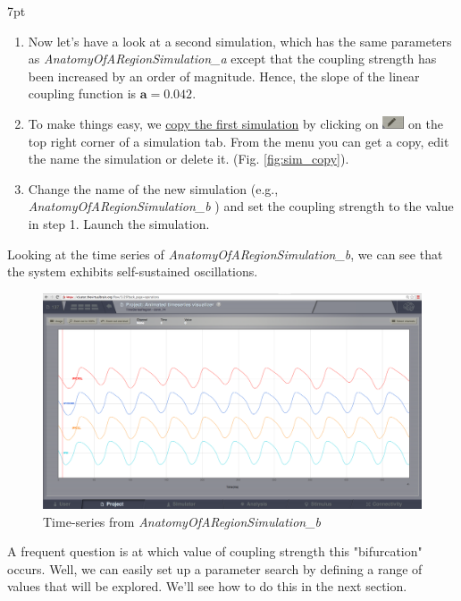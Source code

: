 \documentclass{tufte-handout}
\newenvironment{simulation}{%
  \def\FrameCommand{%
    \hspace{1pt}%
    {\color{ForestGreen}\vrule width 2pt}%
    {\color{simulationshade}\vrule width 4pt}%
    \colorbox{simulationshade}%
  }%
  \MakeFramed{\advance\hsize-\width\FrameRestore}%
  \noindent\hspace{-4.55pt}%
  \begin{adjustwidth}{}{7pt}%
  \vspace{2pt}\vspace{2pt}%
}
{%
  \vspace{2pt}\end{adjustwidth}\endMakeFramed%
}
\begin{document}
\begin{simulation}
\begin{enumerate}
\item Now let's have a look at a second simulation, which has the same parameters as \textit{AnatomyOfARegionSimulation\_a} except that
the coupling strength has been increased by an order of magnitude. Hence, the slope of the linear coupling function is  $\mathbf{a=0.042}$.
\item To make things easy, we \underline{copy the first simulation} by clicking on \includegraphics[width=0.05\textwidth]{butt_pencil.png} on the top right corner of a simulation tab. From the menu you can get a copy, edit the name the simulation or delete it. (Fig. \ref{fig:sim_copy}).
\item Change the name of the new simulation (e.g., \textit{AnatomyOfARegionSimulation\_b} ) and set the coupling strength to the value in step 1. Launch the simulation.
\end{enumerate}
\end{simulation}


Looking at the time series of \textit{AnatomyOfARegionSimulation\_b}, we can see that the system exhibits self-sustained
oscillations. 

\begin{figure}[h]
  \includegraphics[width=\linewidth]{Handout_UI_BuildingYourOwnBrainNetworkModel_AnimatedTimeSeriesOscillatory}%
  \caption{Time-series from \textit{AnatomyOfARegionSimulation\_b}}%
  \label{fig:time_series_oscillatory}%
\end{figure}


A frequent question is at which value of coupling strength this
"bifurcation" occurs. Well, we can easily set up a parameter search by defining a
range of values that will be explored. We'll see how to do this in the next section.
\end{document}
